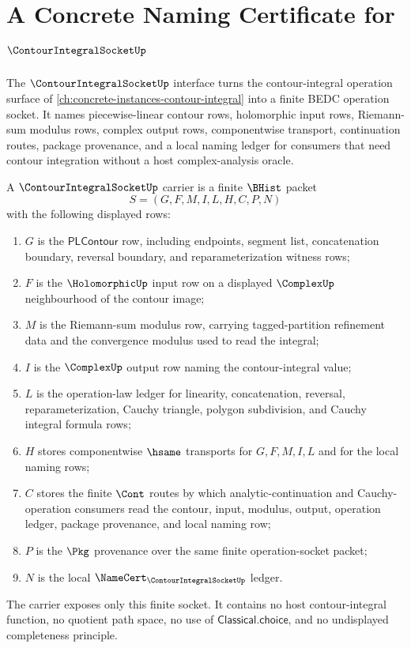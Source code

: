 \chapter{A Concrete Naming Certificate for $\ContourIntegralSocketUp$}
\label{ch:concrete-instances-contourintegralsocket-namecert}

The $\ContourIntegralSocketUp$ interface turns the contour-integral operation surface of \autoref{ch:concrete-instances-contour-integral} into a finite BEDC operation socket. It names piecewise-linear contour rows, holomorphic input rows, Riemann-sum modulus rows, complex output rows, componentwise transport, continuation routes, package provenance, and a local naming ledger for consumers that need contour integration without a host complex-analysis oracle.

\begin{definition}
\label{def:contour-integral-socket-carrier}
A $\ContourIntegralSocketUp$ carrier is a finite $\BHist$ packet
$$
S=(G,F,M,I,L,H,C,P,N)
$$
with the following displayed rows:
\begin{enumerate}
\item $G$ is the $\mathsf{PLContour}$ row, including endpoints, segment list, concatenation boundary, reversal boundary, and reparameterization witness rows;
\item $F$ is the $\HolomorphicUp$ input row on a displayed $\ComplexUp$ neighbourhood of the contour image;
\item $M$ is the Riemann-sum modulus row, carrying tagged-partition refinement data and the convergence modulus used to read the integral;
\item $I$ is the $\ComplexUp$ output row naming the contour-integral value;
\item $L$ is the operation-law ledger for linearity, concatenation, reversal, reparameterization, Cauchy triangle, polygon subdivision, and Cauchy integral formula rows;
\item $H$ stores componentwise $\hsame$ transports for $G,F,M,I,L$ and for the local naming rows;
\item $C$ stores the finite $\Cont$ routes by which analytic-continuation and Cauchy-operation consumers read the contour, input, modulus, output, operation ledger, package provenance, and local naming row;
\item $P$ is the $\Pkg$ provenance over the same finite operation-socket packet;
\item $N$ is the local $\NameCert_{\ContourIntegralSocketUp}$ ledger.
\end{enumerate}
The carrier exposes only this finite socket. It contains no host contour-integral function, no quotient path space, no use of $\mathsf{Classical.choice}$, and no undisplayed completeness principle.
\end{definition}

